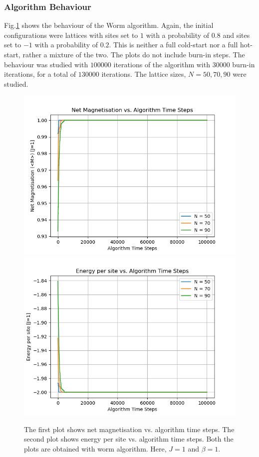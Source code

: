 \documentclass[%
reprint,
 amsmath,amssymb,
 aps,
]{revtex4-2}
\begin{document}
\subsubsection{Algorithm Behaviour}
Fig.\ref{fig:wormbehaviour} shows the behaviour of the Worm algorithm. Again, the initial configurations were lattices with sites set to $1$ with a probability of $0.8$ and sites set to $-1$ with a probability of $0.2$. This is neither a full cold-start nor a full hot-start, rather a mixture of the two. The plots do not include burn-in steps. The behaviour was studied with $100000$ iterations of the algorithm with $30000$ burn-in iterations, for a total of $130000$ iterations. The lattice sizes, $N = 50, 70, 90$ were studied.
\begin{figure}[h!]
    \centering
    \includegraphics[width=\columnwidth]{worm_algobehaviour1.png}
    \includegraphics[width=\columnwidth]{worm_algobehaviour2.png}
    \caption{The first plot shows net magnetisation vs. algorithm time steps. The second plot shows energy per site vs. algorithm time steps. Both the plots are obtained with worm algorithm. Here, $J = 1$ and $\beta = 1$.}
    \label{fig:wormbehaviour}
\end{figure}
\end{document}

